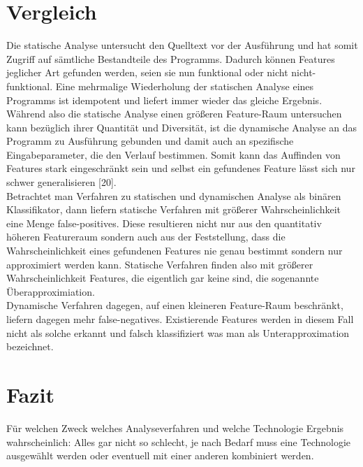 \documentclass[runningheads,a4paper]{llncs}
\begin{document}
\section{Vergleich}
Die statische Analyse untersucht den Quelltext vor der Ausführung und hat somit Zugriff auf sämtliche Bestandteile des Programms. Dadurch können Features
jeglicher Art gefunden werden, seien sie nun funktional oder nicht nicht-funktional. Eine mehrmalige Wiederholung der statischen Analyse eines
Programms ist idempotent und liefert immer wieder das gleiche Ergebnis. \\
Während also die statische Analyse einen größeren Feature-Raum untersuchen kann bezüglich ihrer Quantität und Diversität, ist die dynamische
Analyse an das Programm zu Ausführung gebunden und damit auch an spezifische Eingabeparameter, die den Verlauf bestimmen. Somit kann das Auffinden
von Features stark eingeschränkt sein und selbst ein gefundenes Feature lässt sich nur schwer generalisieren [20]. \\
Betrachtet man Verfahren zu statischen und dynamischen Analyse als binären Klassifikator, dann liefern statische Verfahren mit größerer 
Wahrscheinlichkeit eine Menge false-positives. Diese resultieren nicht nur aus den quantitativ höheren Featureraum sondern auch aus
der Feststellung, dass die Wahrscheinlichkeit eines gefundenen Features nie genau bestimmt sondern nur approximiert werden kann. Statische
Verfahren finden also mit größerer Wahrscheinlichkeit Features, die eigentlich gar keine sind, die sogenannte Überapproximiation. \\
Dynamische Verfahren dagegen, auf einen kleineren Feature-Raum beschränkt, liefern dagegen mehr false-negatives. Existierende Features
werden in diesem Fall nicht als solche erkannt und falsch klassifiziert was man als Unterapproximation bezeichnet.

\section{Fazit}
Für welchen Zweck welches Analyseverfahren und welche Technologie
Ergebnis wahrscheinlich: Alles gar nicht so schlecht, je nach Bedarf muss eine Technologie ausgewählt werden oder eventuell mit einer anderen kombiniert werden.




\clearpage

\end{document}
